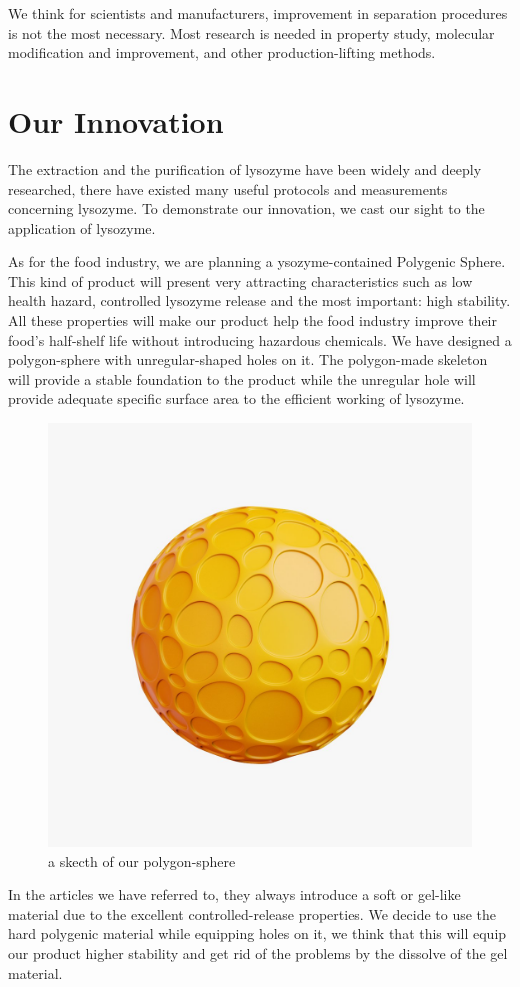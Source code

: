 We think for scientists and manufacturers, improvement in separation procedures is not the most necessary. Most research is needed in property study, molecular modification and improvement, and other production-lifting methods.

\section{Our Innovation}
The extraction and the purification of lysozyme have been widely and deeply researched, there have existed many useful protocols and measurements concerning lysozyme. 
To demonstrate our innovation, we cast our sight to the application of lysozyme. 

As for the food industry, we are planning a ysozyme-contained Polygenic Sphere. This kind of product will present very attracting characteristics such as low health hazard, controlled lysozyme release and the most important: high stability. All these properties will make our product help the food industry improve their food’s half-shelf life without introducing hazardous chemicals. We have designed a polygon-sphere with unregular-shaped holes on it. The polygon-made skeleton will provide a stable foundation to the product while the unregular hole will provide adequate specific surface area to the efficient working of lysozyme.

\begin{figure}[!h]
	\centering
	\includegraphics[width=0.7\linewidth]{figures/chp2_innovation}
	\caption{a skecth of our polygon-sphere}
	\label{fig:chp2innovation}
\end{figure}


In the articles we have referred to, they always introduce a soft or gel-like material due to the excellent controlled-release properties. We decide to use the hard polygenic material while equipping holes on it, we think that this will equip our product higher stability and get rid of the problems by the dissolve of the gel material. 

